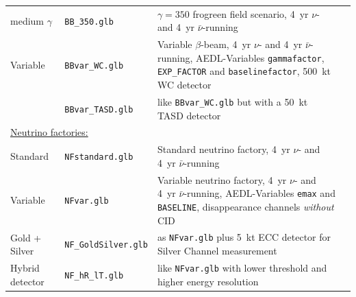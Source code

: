\begin{table}[tbp]
\begin{center}
\begin{tabular}{llp{7.5cm}c}
medium $\gamma$ & {\tt BB\_350.glb} & $\gamma=350$ frogreen field scenario, 4~yr $\nu$- and
4~yr $\bar{\nu}$-running & \cite{Burguet-Castell:2005pa} \\[0.2cm]

Variable & {\tt BBvar\_WC.glb} & Variable $\beta$-beam, 4~yr $\nu$- and 
4~yr $\bar{\nu}$-running, {\sf AEDL}-Variables {\tt gammafactor}, 
{\tt EXP\_FACTOR} and {\tt baselinefactor}, 500~kt WC detector & \cite{Huber:2005jk} \\[0.2cm]

	& {\tt BBvar\_TASD.glb} & like {\tt BBvar\_WC.glb} but with a 50~kt TASD detector  
& \cite{Huber:2005jk} \\[0.2cm]

\multicolumn{4}{l}{\underline{Neutrino factories:}} \\[0.2cm]

Standard & {\tt NFstandard.glb} & Standard neutrino factory, 
4~yr $\nu$- and 4~yr $\bar{\nu}$-running & \cite{Huber:2002mx} \\[0.2cm]

Variable  & {\tt NFvar.glb} & Variable neutrino factory, 4~yr 
$\nu$- and 4~yr $\bar{\nu}$-running, {\sf AEDL}-Variables {\tt emax} and {\tt BASELINE}, disappearance channels
{\em without} CID & \cite{Huber:2002mx,Huber:2006wb}  \\[0.2cm]

Gold + Silver & {\tt NF\_GoldSilver.glb} & as {\tt NFvar.glb} 
plus 5~kt ECC detector for Silver Channel
measurement & \cite{Huber:2002mx,Huber:2006wb,Autiero:2003fu} \\[0.2cm]

Hybrid detector & {\tt NF\_hR\_lT.glb} & like {\tt NFvar.glb} 
with lower threshold and higher energy resolution & \cite{Huber:2002mx,Huber:2006wb} \\[0.2cm]

\hline
\end{tabular}
\end{center}
\end{table}

